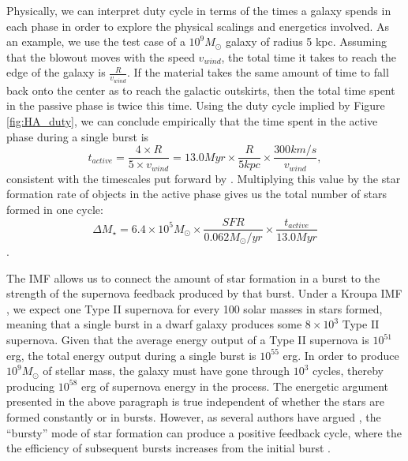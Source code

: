 \documentclass[iop]{emulateapj}
\begin{document}
Physically, we can interpret duty cycle in terms of the times a galaxy spends in each phase in order to explore the physical scalings and energetics involved. As an example, we use the test case of a $10^9 M_{\odot}$ galaxy of radius 5 kpc. Assuming that the blowout moves with the speed $v_{wind}$, the total time it takes to reach the edge of the galaxy is $\frac{R}{v_{wind}}$. If the material takes the same amount of time to fall back onto the center as to reach the galactic outskirts, then the total time spent in the passive phase is twice this time. Using the duty cycle implied by Figure \ref{fig:HA_duty}, we can conclude empirically that the time spent in the active phase during a single burst is $$t_{active} = \frac{4 \times R}{5 \times v_{wind}} = 13.0 Myr \times \frac{R}{5 kpc}\times \frac{300 km/s}{v_{wind}},  $$ consistent with the timescales put forward by \cite{EB17}. Multiplying this value by the star formation rate of objects in the active phase gives us the total number of stars formed in one cycle:
$$\Delta M_{\star} = 6.4 \times 10^5 M_{\odot} \times \frac{SFR}{0.062 M_{\odot}/yr} \times \frac{t_{active}}{13.0 Myr}$$.

The IMF allows us to connect the amount of star formation in a burst to the strength of the supernova feedback produced by that burst. Under a Kroupa IMF \citep{Kroupa02}, we expect one Type II supernova for every 100 solar masses in stars formed, meaning that a single burst in a dwarf galaxy produces some $8 \times 10^3$ Type II supernova. Given that the average energy output of a Type II supernova is $10^{51}$ erg, the total energy output during a single burst is $10^{55}$ erg. In order to produce $10^9 M_{\odot}$ of stellar mass, the galaxy must have gone through $10^3$ cycles, thereby producing $10^{58}$ erg of supernova energy in the process. The energetic argument presented in the above paragraph is true independent of whether the stars are formed constantly or in bursts. However, as several authors have argued \citep{Governato12,GK13}, the ``bursty'' mode of star formation can produce a positive feedback cycle, where the the efficiency of subsequent bursts increases from the initial burst \cite[see][]{Pontzen12,Governato12}. 

\end{document}
